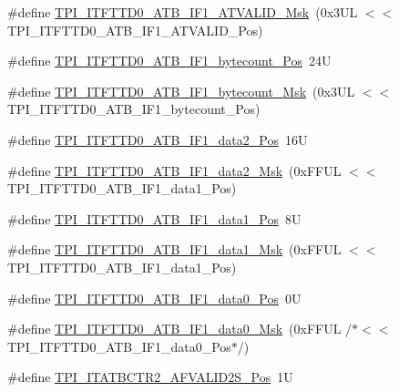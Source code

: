 \begin{DoxyCompactItemize}
\item 
\#define \hyperlink{group___c_m_s_i_s___t_p_i_ga8650e68e2efc65b0d94de91772dc5940}{T\+P\+I\+\_\+\+I\+T\+F\+T\+T\+D0\+\_\+\+A\+T\+B\+\_\+\+I\+F1\+\_\+\+A\+T\+V\+A\+L\+I\+D\+\_\+\+Msk}~(0x3\+U\+L $<$$<$ T\+P\+I\+\_\+\+I\+T\+F\+T\+T\+D0\+\_\+\+A\+T\+B\+\_\+\+I\+F1\+\_\+\+A\+T\+V\+A\+L\+I\+D\+\_\+\+Pos)
\item 
\#define \hyperlink{group___c_m_s_i_s___t_p_i_gae82d334486fb5d11e57e8e07fd21be7b}{T\+P\+I\+\_\+\+I\+T\+F\+T\+T\+D0\+\_\+\+A\+T\+B\+\_\+\+I\+F1\+\_\+bytecount\+\_\+\+Pos}~24U
\item 
\#define \hyperlink{group___c_m_s_i_s___t_p_i_ga71301ef5984fef602d83305f34ea5c97}{T\+P\+I\+\_\+\+I\+T\+F\+T\+T\+D0\+\_\+\+A\+T\+B\+\_\+\+I\+F1\+\_\+bytecount\+\_\+\+Msk}~(0x3\+U\+L $<$$<$ T\+P\+I\+\_\+\+I\+T\+F\+T\+T\+D0\+\_\+\+A\+T\+B\+\_\+\+I\+F1\+\_\+bytecount\+\_\+\+Pos)
\item 
\#define \hyperlink{group___c_m_s_i_s___t_p_i_ga79e526cc6f0857f45187e897f4009f55}{T\+P\+I\+\_\+\+I\+T\+F\+T\+T\+D0\+\_\+\+A\+T\+B\+\_\+\+I\+F1\+\_\+data2\+\_\+\+Pos}~16U
\item 
\#define \hyperlink{group___c_m_s_i_s___t_p_i_ga942cc46e6e858b215e81ef6b57c3f63f}{T\+P\+I\+\_\+\+I\+T\+F\+T\+T\+D0\+\_\+\+A\+T\+B\+\_\+\+I\+F1\+\_\+data2\+\_\+\+Msk}~(0x\+F\+F\+U\+L $<$$<$ T\+P\+I\+\_\+\+I\+T\+F\+T\+T\+D0\+\_\+\+A\+T\+B\+\_\+\+I\+F1\+\_\+data1\+\_\+\+Pos)
\item 
\#define \hyperlink{group___c_m_s_i_s___t_p_i_ga7715fac6bd637e7ec153518da1fd4f0b}{T\+P\+I\+\_\+\+I\+T\+F\+T\+T\+D0\+\_\+\+A\+T\+B\+\_\+\+I\+F1\+\_\+data1\+\_\+\+Pos}~8U
\item 
\#define \hyperlink{group___c_m_s_i_s___t_p_i_gada0033c411d5b57161b6e5c244518836}{T\+P\+I\+\_\+\+I\+T\+F\+T\+T\+D0\+\_\+\+A\+T\+B\+\_\+\+I\+F1\+\_\+data1\+\_\+\+Msk}~(0x\+F\+F\+U\+L $<$$<$ T\+P\+I\+\_\+\+I\+T\+F\+T\+T\+D0\+\_\+\+A\+T\+B\+\_\+\+I\+F1\+\_\+data1\+\_\+\+Pos)
\item 
\#define \hyperlink{group___c_m_s_i_s___t_p_i_gae6ff8b9a79602a3546d951261d787cc7}{T\+P\+I\+\_\+\+I\+T\+F\+T\+T\+D0\+\_\+\+A\+T\+B\+\_\+\+I\+F1\+\_\+data0\+\_\+\+Pos}~0U
\item 
\#define \hyperlink{group___c_m_s_i_s___t_p_i_gafb950b90ccb002e81ae6c44482cd46fd}{T\+P\+I\+\_\+\+I\+T\+F\+T\+T\+D0\+\_\+\+A\+T\+B\+\_\+\+I\+F1\+\_\+data0\+\_\+\+Msk}~(0x\+F\+F\+U\+L /$\ast$$<$$<$ T\+P\+I\+\_\+\+I\+T\+F\+T\+T\+D0\+\_\+\+A\+T\+B\+\_\+\+I\+F1\+\_\+data0\+\_\+\+Pos$\ast$/)
\item 
\#define \hyperlink{group___c_m_s_i_s___t_p_i_ga7b77f85ad8cad3c00b490ca18ba52263}{T\+P\+I\+\_\+\+I\+T\+A\+T\+B\+C\+T\+R2\+\_\+\+A\+F\+V\+A\+L\+I\+D2\+S\+\_\+\+Pos}~1U

\end{DoxyCompactItemize}
